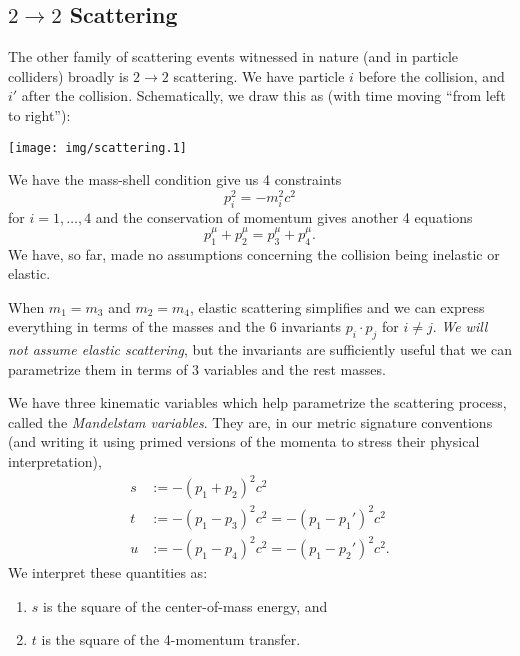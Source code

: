 \subsection{$2\to 2$ Scattering}

\M
The other family of scattering events witnessed in nature (and in
particle colliders) broadly is $2\to2$ scattering. We have particle $i$
before the collision, and $i'$ after the collision. Schematically, we
draw this as (with time moving ``from left to right''):
\begin{center}
  \texttt{[image: img/scattering.1]}
\end{center}
We have the mass-shell condition give us 4 constraints
\begin{equation}
p_{i}^{2} = -m_{i}^{2}c^{2}
\end{equation}
for $i=1,\dots,4$ and the conservation of momentum gives another 4
equations
\begin{equation}
p^{\mu}_{1} + p^{\mu}_{2} = p^{\mu}_{3} + p^{\mu}_{4}.
\end{equation}
We have, so far, made no assumptions concerning the collision being
inelastic or elastic.

When $m_{1}=m_{3}$ and $m_{2}=m_{4}$, elastic scattering simplifies and
we can express everything in terms of the masses and the 6 invariants
$p_{i}\cdot p_{j}$ for $i\neq j$. \emph{We will not assume elastic scattering},
but the invariants are sufficiently useful that we can parametrize them
in terms of 3 variables and the rest masses.

We have three kinematic variables which help parametrize the scattering
process, called the \emph{Mandelstam variables}. They are, in our metric
signature conventions (and writing it using primed versions of the
momenta to stress their physical interpretation),
\begin{subequations}
\begin{align}
s &:= -(p_{1} + p_{2})^{2}c^{2}\\
t &:= -(p_{1} - p_{3})^{2}c^{2} = -(p_{1} - p_{1}')^{2}c^{2}\\
u &:= -(p_{1} - p_{4})^{2}c^{2} = -(p_{1} - p_{2}')^{2}c^{2}.
\end{align}
\end{subequations}
We interpret these quantities as:
\begin{enumerate}
\item $s$ is the square of the center-of-mass energy, and
\item $t$ is the square of the 4-momentum transfer.
\end{enumerate}

